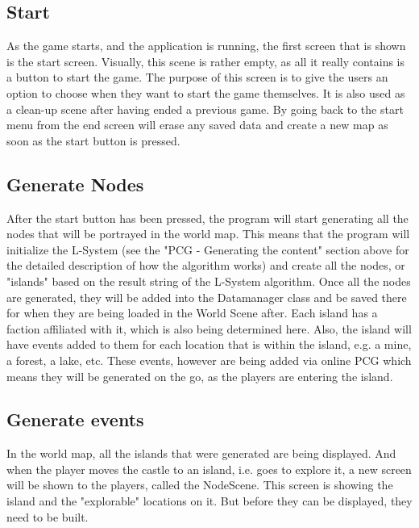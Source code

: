 \subsection{Start}
As the game starts, and the application is running, the first screen that is shown is the start screen. Visually, this scene is rather empty, as all it really contains is a button to start the game. The purpose of this screen is to give the users an option to choose when they want to start the game themselves. It is also used as a clean-up scene after having ended a previous game. By going back to the start menu from the end screen will erase any saved data and create a new map as soon as the start button is pressed.

\subsection{Generate Nodes}
After the start button has been pressed, the program will start generating all the nodes that will be portrayed in the world map. This means that the program will initialize the L-System (see the "PCG - Generating the content" section above for the detailed description of how the algorithm works) and create all the nodes, or "islands" based on the result string of the L-System algorithm. Once all the nodes are generated, they will be added into the Datamanager class and be saved there for when they are being loaded in the World Scene after. 
Each island has a faction affiliated with it, which is also being determined here. Also, the island will have events added to them for each location that is within the island, e.g. a mine, a forest, a lake, etc. These events, however are being added via online PCG which means they will be generated on the go, as the players are entering the island.

\subsection{Generate events}
In the world map, all the islands that were generated are being displayed. And when the player moves the castle to an island, i.e. goes to explore it, a new screen will be shown to the players, called the NodeScene. This screen is showing the island and the "explorable" locations on it. But before they can be displayed, they need to be built. 

